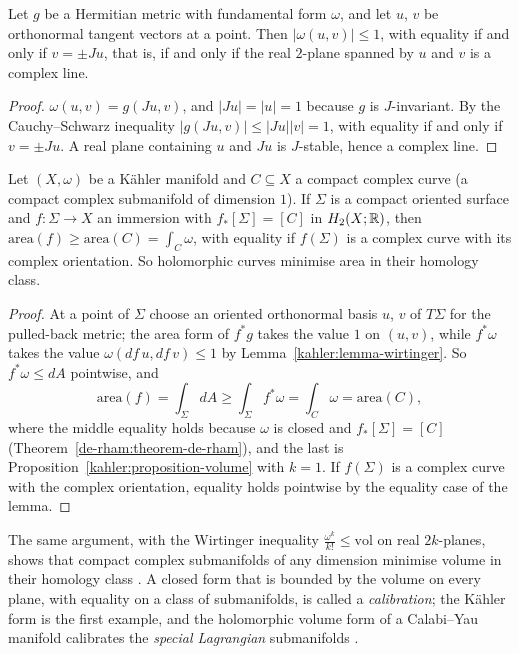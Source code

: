 \begin{lemma}\label{kahler:lemma-wirtinger}
Let $g$ be a Hermitian metric with fundamental form $\omega$, and let $u$, $v$ be orthonormal tangent vectors at a point. Then $|\omega(u, v)| \leq 1$, with equality if and only if $v = \pm Ju$, that is, if and only if
the real $2$-plane spanned by $u$ and $v$ is a complex line.
\end{lemma}

\begin{proof}
$\omega(u, v) = g(Ju, v)$, and $|Ju| = |u| = 1$ because $g$ is $J$-invariant. By the Cauchy--Schwarz inequality $|g(Ju, v)| \leq |Ju||v| = 1$, with equality if and only if $v = \pm Ju$. A real plane containing $u$
and $Ju$ is $J$-stable, hence a complex line.
\end{proof}

\begin{proposition}\label{kahler:proposition-area-minimising}
Let $(X, \omega)$ be a K\"ahler manifold and $C \subseteq X$ a compact complex curve (a compact complex submanifold of dimension $1$). If $\Sigma$ is a compact oriented surface and $f \colon \Sigma \to X$ an immersion
with $f_*[\Sigma] = [C]$ in $H_2(X; \mathbb{R})$, then $\mathrm{area}(f) \geq \mathrm{area}(C) = \int_C\omega$, with equality if $f(\Sigma)$ is a complex curve with its complex orientation. So holomorphic curves minimise area in
their homology class.
\end{proposition}

\begin{proof}
At a point of $\Sigma$ choose an oriented orthonormal basis $u$, $v$ of $T\Sigma$ for the pulled-back metric; the area form of $f^*g$ takes the value $1$ on $(u, v)$, while $f^*\omega$ takes the value
$\omega(df\,u, df\,v) \leq 1$ by Lemma~\ref{kahler:lemma-wirtinger}. So $f^*\omega \leq dA$ pointwise, and
\[
\mathrm{area}(f) = \int_\Sigma dA \geq \int_\Sigma f^*\omega = \int_C\omega = \mathrm{area}(C),
\]
where the middle equality holds because $\omega$ is closed and $f_*[\Sigma] = [C]$ (Theorem~\ref{de-rham:theorem-de-rham}), and the last is Proposition~\ref{kahler:proposition-volume} with $k = 1$. If $f(\Sigma)$ is a
complex curve with the complex orientation, equality holds pointwise by the equality case of the lemma.
\end{proof}

\begin{remark}\label{kahler:remark-calibrations}
The same argument, with the Wirtinger inequality $\frac{\omega^k}{k!} \leq \mathrm{vol}$ on real $2k$-planes, shows that compact complex submanifolds of any dimension minimise volume in their homology class
\cite[Chapter 0, Section 2]{griffiths-harris}. A closed form that is bounded by the volume on every plane, with equality on a class of submanifolds, is called a \emph{calibration}; the K\"ahler form is the first
example, and the holomorphic volume form of a Calabi--Yau manifold calibrates the \emph{special Lagrangian} submanifolds \cite{joyce-special-holonomy}.
\end{remark}

